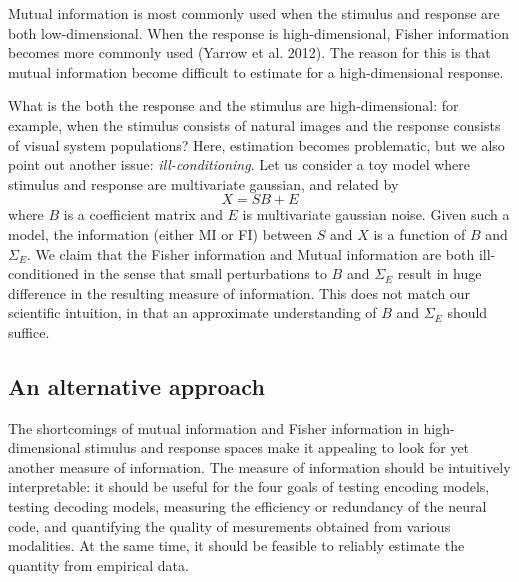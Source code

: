 \documentclass[12pt]{article}
\begin{document}
Mutual information is most commonly used when the stimulus and
response are both low-dimensional.  When the response is
high-dimensional, Fisher information becomes more commonly used
(Yarrow et al. 2012).  The reason for this is that mutual information
become difficult to estimate for a high-dimensional response.

What is the both the response and the stimulus are high-dimensional:
for example, when the stimulus consists of natural images and
the response consists of visual system populations?
Here, estimation becomes problematic, but we also point out another issue:
\emph{ill-conditioning}.
Let us consider a toy model where stimulus and response are multivariate gaussian,
and related by
\[
X = SB + E
\]
where $B$ is a coefficient matrix and $E$ is multivariate gaussian
noise.  Given such a model, the information (either MI or FI) between
$S$ and $X$ is a function of $B$ and $\Sigma_E$.  We claim that the
Fisher information and Mutual information are both ill-conditioned in
the sense that small perturbations to $B$ and $\Sigma_E$ result in
huge difference in the resulting measure of information.  This does
not match our scientific intuition, in that an approximate
understanding of $B$ and $\Sigma_E$ should suffice.

\subsection{An alternative approach}

The shortcomings of mutual information and Fisher information in
high-dimensional stimulus and response spaces make it appealing to
look for yet another measure of information.  The measure of
information should be intuitively interpretable: it should be useful
for the four goals of testing encoding models, testing decoding
models, measuring the efficiency or redundancy of the neural code, and
quantifying the quality of mesurements obtained from various
modalities.  At the same time, it should be feasible to reliably
estimate the quantity from empirical data.
\end{document}
